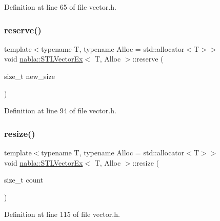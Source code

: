 Definition at line 65 of file vector.\+h.

\mbox{\label{classnabla_1_1_s_t_l_vector_ex_abc4120d95527b1e5758ee5f3f37efd8d}} 
\subsubsection{\texorpdfstring{reserve()}{reserve()}}
{\footnotesize\ttfamily template$<$typename T, typename Alloc = std\+::allocator$<$\+T$>$$>$ \\
void \mbox{\hyperlink{classnabla_1_1_s_t_l_vector_ex}{nabla\+::\+S\+T\+L\+Vector\+Ex}}$<$ T, Alloc $>$\+::reserve (\begin{DoxyParamCaption}\item[{size\+\_\+t}]{new\+\_\+size }\end{DoxyParamCaption})\hspace{0.3cm}{\ttfamily [inline]}}



Definition at line 94 of file vector.\+h.

\mbox{\label{classnabla_1_1_s_t_l_vector_ex_a5c67e1289e13c47ca12bfc0df7f4d746}} 
\subsubsection{\texorpdfstring{resize()}{resize()}\hspace{0.1cm}{\footnotesize\ttfamily [1/2]}}
{\footnotesize\ttfamily template$<$typename T, typename Alloc = std\+::allocator$<$\+T$>$$>$ \\
void \mbox{\hyperlink{classnabla_1_1_s_t_l_vector_ex}{nabla\+::\+S\+T\+L\+Vector\+Ex}}$<$ T, Alloc $>$\+::resize (\begin{DoxyParamCaption}\item[{size\+\_\+t}]{count }\end{DoxyParamCaption})\hspace{0.3cm}{\ttfamily [inline]}}



Definition at line 115 of file vector.\+h.

